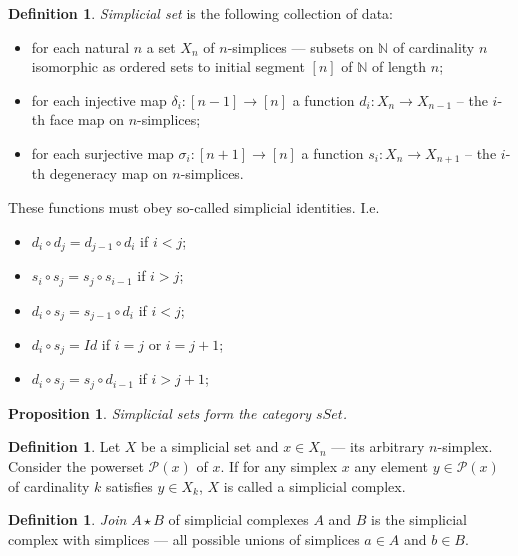 \documentclass[a4paper, 12pt]{article}
\newcounter{stmcounter}[section]
\numberwithin{equation}{section}
\newtheorem{proposition}[stmcounter]{Proposition}
\theoremstyle{definition}
\newtheorem{definition}[stmcounter]{Definition}
\theoremstyle{remark}
\newcommand{\define}[1]{{\textit{#1}}}
\begin{document}
\begin{definition}
  \define{Simplicial set} is the following collection of data:
  \begin{itemize}
     \item for each natural $n$ a set $X_n$ of $n$-simplices --- subsets on $\mathbb{N}$ of cardinality $n$ isomorphic as ordered sets to initial segment $[n]$ of $\mathbb{N}$ of length $n$;
     \item for each injective map $\delta_i : [n-1] \to [n]$ a function $d_i: X_n \to X_{n-1}$ – the $i$-th face map on $n$-simplices;
     \item for each surjective map $\sigma_i : [n+1] \to [n]$ a function $s_i : X_n \to X_{n+1}$ – the $i$-th degeneracy map on $n$-simplices.
  \end{itemize}

  These functions must obey so-called simplicial identities. I.e.
  \begin{itemize}
    \item $d_i \circ d_j = d_{j-1} \circ d_i$ if $i < j$;
    \item $s_i \circ s_j = s_j \circ s_{i-1}$ if $i > j$;
    \item $d_i \circ s_j = s_{j-1} \circ d_i$ if $i < j$;
    \item $d_i \circ s_j = Id$ if $i = j$ or $i = j + 1$;
    \item $d_i \circ s_j = s_j \circ d_{i-1}$ if $i > j + 1$;
  \end{itemize}
\end{definition}

\begin{proposition}
  Simplicial sets form the category $sSet$.
\end{proposition}

\begin{definition}
  Let $X$ be a simplicial set and $x \in X_n$ --- its arbitrary $n$-simplex. Consider the powerset $\mathcal{P}(x)$ of $x$. If for any simplex $x$ any element $y \in \mathcal{P}(x)$ of cardinality $k$ satisfies $y \in X_k$, $X$ is called a simplicial complex.
\end{definition}

\begin{definition}
  \define{Join} $A \star B$ of simplicial complexes $A$ and $B$ is the simplicial complex with simplices --- all possible unions of simplices $a \in A$ and $b \in B$.
\end{definition}
\end{document}
